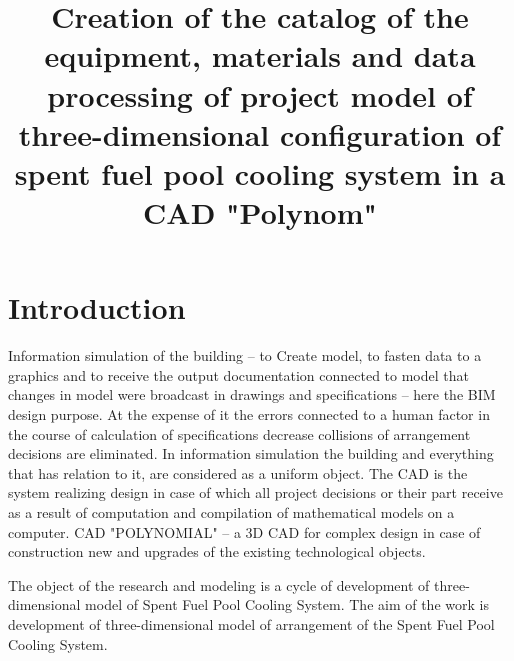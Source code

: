 \documentclass[conference]{IEEEtran}
\begin{document}
%
\title{Creation of the catalog of the equipment, materials and data processing of project model of three-dimensional configuration of spent fuel pool cooling system in a CAD "Polynom"}









\maketitle


\begin{abstract}

\end{abstract}

\begin{IEEEkeywords}

\end{IEEEkeywords}



\IEEEpeerreviewmaketitle



\section{Introduction}

Information simulation of the building – to Create model, to fasten data to a graphics and to receive the output documentation connected to model that changes in model were broadcast in drawings and specifications – here the BIM design purpose. 
At the expense of it the errors connected to a human factor in the course of calculation of specifications decrease collisions of arrangement decisions are eliminated. In information simulation the building and everything that has relation to it, are considered as a uniform object.
The CAD is the system realizing design in case of which all project decisions or their part receive as a result of computation and compilation of mathematical models on a computer. CAD "POLYNOMIAL" – a 3D CAD for complex design in case of construction new and upgrades of the existing technological objects.

The object of the research and modeling is a cycle of development of three-dimensional model of Spent Fuel Pool Cooling System. The aim of the work is development of three-dimensional model of arrangement of the Spent Fuel Pool Cooling System. 
\end{document}
